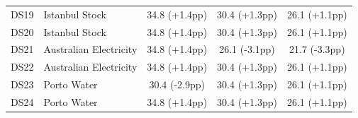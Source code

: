 \begin{table}[t]
{{\begin{tabular}{llccc}
DS19 & Istanbul Stock & 34.8 (+1.4pp) & 30.4 (+1.3pp) & 26.1 (+1.1pp) \\
DS20 & Istanbul Stock & 34.8 (+1.4pp) & 30.4 (+1.3pp) & 26.1 (+1.1pp) \\
DS21 & Australian Electricity & 34.8 (+1.4pp) & 26.1 (-3.1pp) & 21.7 (-3.3pp) \\
DS22 & Australian Electricity & 34.8 (+1.4pp) & 30.4 (+1.3pp) & 26.1 (+1.1pp) \\
DS23 & Porto Water & 30.4 (-2.9pp) & 30.4 (+1.3pp) & 26.1 (+1.1pp) \\
DS24 & Porto Water & 34.8 (+1.4pp) & 30.4 (+1.3pp) & 26.1 (+1.1pp) \\
\bottomrule
\end{tabular}%
}%
}
\end{table}

